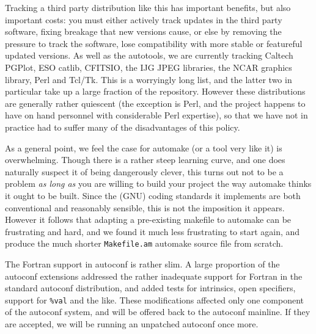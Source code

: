 \documentclass{speauth}
\begin{document}
Tracking \label{s:tracking} a third party distribution like this has
important benefits, but also important costs: you must either actively
track updates in the third party software, fixing breakage that new
versions cause, or else by removing the pressure to track the
software, lose compatibility with more stable or featureful updated
versions.  As well as the autotools, we are currently tracking Caltech
PGPlot, ESO catlib, CFITSIO, the IJG JPEG libraries, the NCAR graphics
library, Perl and Tcl/Tk.  This is a worryingly long list, and the
latter two in particular take up a large fraction of the repository.
However these distributions are generally rather quiescent (the
exception is Perl, and the project happens to have on hand personnel
with considerable Perl expertise), so that we have not in practice had
to suffer many of the disadvantages of this policy.

As a general point, we feel the case for automake (or a tool very like
it) is overwhelming.  Though
there is a rather steep learning curve, and one does naturally suspect
it of being dangerously clever, this turns out not to be a problem
\emph{as long as} you are willing to build your project the way
automake thinks it ought to be built.  Since the (GNU) coding
standards it implements are both conventional and reasonably sensible,
this is not the imposition it appears.  However it follows that
adapting a pre-existing makefile to automake can be frustrating and
hard, and we found it much less frustrating to start again, and produce the
much shorter \texttt{Makefile.am} automake source file from scratch.

The Fortran support in autoconf is rather slim.  A large proportion of the
autoconf extensions addressed the rather inadequate support for
Fortran in the standard autoconf distribution, and added tests for
intrinsics, open specifiers, support for \texttt{\%val} 
and the like.  These modifications affected only one component of the
autoconf system, and will be offered back to the autoconf mainline.
If they are accepted, we will be running an unpatched autoconf once
more.
\end{document}
